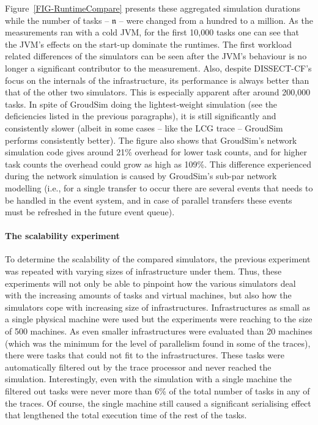 \documentclass[sort, compress, 5p]{elsarticle}
\begin{document}
Figure~\ref{FIG-RuntimeCompare} presents these aggregated simulation durations while the number of tasks -- $\mathfrak{n}$ -- were changed from a hundred to a million. As the measurements ran with a cold JVM, for the first 10,000 tasks one can see that the JVM's effects on the start-up dominate the runtimes. The first workload related differences of the simulators can be seen after the JVM's behaviour is no longer a significant contributor to the measurement. Also, despite DISSECT-CF's focus on the internals of the infrastructure, its performance is always better than that of the other two simulators. This is especially apparent after around 200,000 tasks. In spite of GroudSim doing the lightest-weight simulation (see the deficiencies listed in the previous paragraphs), it is still significantly and consistently slower (albeit in some cases -- like the LCG trace -- GroudSim performs consistently better). The figure also shows that GroudSim's network simulation code gives around 21\% overhead for lower task counts, and for higher task counts the overhead could grow as high as 109\%. This difference experienced during the network simulation is caused by GroudSim's sub-par network modelling (i.e., for a single transfer to occur there are several events that needs to be handled in the event system, and in case of parallel transfers these events must be refreshed in the future event queue).

\paragraph{The scalability experiment}

To determine the scalability of the compared simulators, the previous experiment was repeated with varying sizes of infrastructure under them. Thus, these experiments will not only be able to pinpoint how the various simulators deal with the increasing amounts of tasks and virtual machines, but also how the simulators cope with increasing size of infrastructures. Infrastructures as small as a single physical machine were used but the experiments were reaching to the size of 500 machines. As even smaller infrastructures were evaluated than 20 machines (which was the minimum for the level of parallelism found in some of the traces), there were tasks that could not fit to the infrastructures. These tasks were automatically filtered out by the trace processor and never reached the simulation. Interestingly, even with the simulation with a single machine the filtered out tasks were never more than 6\% of the total number of tasks in any of the traces. Of course, the single machine still caused a significant serialising effect that lengthened the total execution time of the rest of the tasks.
\end{document}
